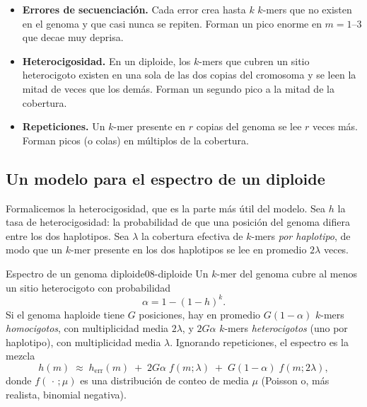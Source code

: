 \begin{itemize}
  \item \textbf{Errores de secuenciación.} Cada error crea hasta $k$ $k$-mers que no existen en el genoma y que casi nunca se repiten. Forman un pico enorme en $m=1$--$3$ que decae muy deprisa.
  \item \textbf{Heterocigosidad.} En un diploide, los $k$-mers que cubren un sitio heterocigoto existen en una sola de las dos copias del cromosoma y se leen la mitad de veces que los demás. Forman un segundo pico a la mitad de la cobertura.
  \item \textbf{Repeticiones.} Un $k$-mer presente en $r$ copias del genoma se lee $r$ veces más. Forman picos (o colas) en múltiplos de la cobertura.
\end{itemize}

\subsection{Un modelo para el espectro de un diploide}

Formalicemos la heterocigosidad, que es la parte más útil del modelo. Sea $h$ la tasa de heterocigosidad: la probabilidad de que una posición del genoma difiera entre los dos haplotipos. Sea $\lambda$ la cobertura efectiva de $k$-mers \emph{por haplotipo}, de modo que un $k$-mer presente en los dos haplotipos se lee en promedio $2\lambda$ veces.

\begin{teorema}{Espectro de un genoma diploide}{08-diploide}
Un $k$-mer del genoma cubre al menos un sitio heterocigoto con probabilidad
\begin{equation}\label{eq:08-alfa}
\alpha = 1-(1-h)^k .
\end{equation}
Si el genoma haploide tiene $G$ posiciones, hay en promedio $G(1-\alpha)$ $k$-mers \emph{homocigotos}, con multiplicidad media $2\lambda$, y $2G\alpha$ $k$-mers \emph{heterocigotos} (uno por haplotipo), con multiplicidad media $\lambda$. Ignorando repeticiones, el espectro es la mezcla
\begin{equation}\label{eq:08-mezcla}
h(m) \;\approx\; h_{\text{err}}(m) \;+\; 2G\alpha\; f(m;\lambda) \;+\; G(1-\alpha)\; f(m;2\lambda),
\end{equation}
donde $f(\,\cdot\,;\mu)$ es una distribución de conteo de media $\mu$ (Poisson o, más realista, binomial negativa).
\end{teorema}

\begin{simbolos}
\end{simbolos}

